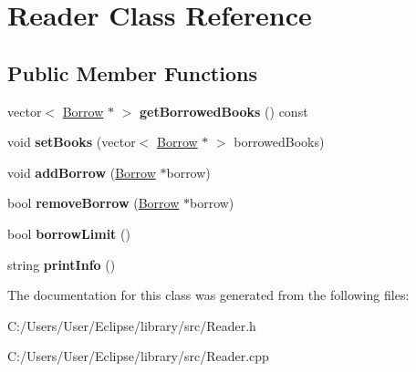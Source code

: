 \hypertarget{class_reader}{\section{Reader Class Reference}
\label{class_reader}
}
\subsection*{Public Member Functions}
\begin{DoxyCompactItemize}
\item 
\hypertarget{class_reader_a6e2caa78c9fa8c1b1f643fb34b176cb7}{vector$<$ \hyperlink{class_borrow}{Borrow} $\ast$ $>$ {\bfseries get\+Borrowed\+Books} () const }\label{class_reader_a6e2caa78c9fa8c1b1f643fb34b176cb7}

\item 
\hypertarget{class_reader_acf9e08569965a31462812220d9292b27}{void {\bfseries set\+Books} (vector$<$ \hyperlink{class_borrow}{Borrow} $\ast$ $>$ borrowed\+Books)}\label{class_reader_acf9e08569965a31462812220d9292b27}

\item 
\hypertarget{class_reader_a3cd9302e5981eb3c19697e86904a05f8}{void {\bfseries add\+Borrow} (\hyperlink{class_borrow}{Borrow} $\ast$borrow)}\label{class_reader_a3cd9302e5981eb3c19697e86904a05f8}

\item 
\hypertarget{class_reader_acb8a0980b5838c5ffaa5376ec7685d00}{bool {\bfseries remove\+Borrow} (\hyperlink{class_borrow}{Borrow} $\ast$borrow)}\label{class_reader_acb8a0980b5838c5ffaa5376ec7685d00}

\item 
\hypertarget{class_reader_a78d4b1c4794d70a8dcbfd037b96ba9c6}{bool {\bfseries borrow\+Limit} ()}\label{class_reader_a78d4b1c4794d70a8dcbfd037b96ba9c6}

\item 
\hypertarget{class_reader_a8d8a7db1b8989f618dc42b8be9c7cbd2}{string {\bfseries print\+Info} ()}\label{class_reader_a8d8a7db1b8989f618dc42b8be9c7cbd2}

\end{DoxyCompactItemize}


The documentation for this class was generated from the following files\+:\begin{DoxyCompactItemize}
\item 
C\+:/\+Users/\+User/\+Eclipse/library/src/Reader.\+h\item 
C\+:/\+Users/\+User/\+Eclipse/library/src/Reader.\+cpp\end{DoxyCompactItemize}

